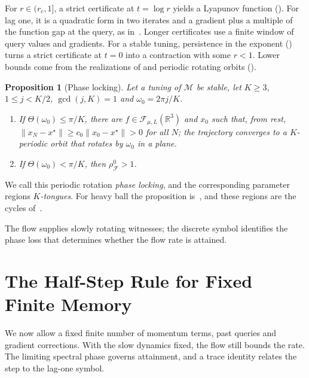 \documentclass[11pt]{article}
\newtheorem{proposition}[theorem]{Proposition}
\theoremstyle{definition}
\theoremstyle{remark}
\newcommand{\R}{\mathbb R}
\newcommand{\cF}{\mathcal F}
\newcommand{\cM}{\mathcal M}
\newcommand{\norm}[1]{\lVert #1\rVert}
\newcommand{\rhoz}{\rho_{\cF}^{0}}
\begin{document}
For \(r\in(r_c,1]\), a strict certificate at \(t=\log r\) yields a Lyapunov function ().
For lag one, it is a quadratic form in two iterates and a gradient plus a
multiple of the function gap at the query, as
in~\cite{VFL18,LRP16,HL17,CHVL18}.  Longer certificates use a finite window
of query values and gradients.  For a stable tuning, persistence in the exponent ()
turns a strict certificate at \(t=0\) into a contraction with some \(r<1\).
Lower bounds come from the realizations of  and periodic rotating orbits ().

\begin{proposition}[Phase locking]\label{prop:cycles}
Let a tuning of \(\cM\) be stable, let \(K\ge3\), \(1\le j<K/2\),
\(\gcd(j,K)=1\) and \(\omega_0=2\pi j/K\).
\begin{enumerate}[label=\textup{(\alph*)}]
\item If \(\Theta(\omega_0)\le\pi/K\), there are \(f\in\cF_{\mu,L}(\R^3)\)
and \(x_0\) such that, from rest,
\(\norm{x_N-x^\star}\ge c_0\norm{x_0-x^\star}>0\) for all \(N\); the
trajectory converges to a \(K\)-periodic orbit that rotates by \(\omega_0\)
in a plane.
\item If \(\Theta(\omega_0)<\pi/K\), then \(\rhoz>1\).
\end{enumerate}
\end{proposition}

We call this periodic rotation \emph{phase locking}, and the corresponding
parameter regions \emph{\(K\)-tongues}.  For heavy ball the proposition
is~\cite[Theorem~3.3(ii)]{TA}, and these regions are the cycles of~\cite{GTD}.

The flow supplies slowly rotating witnesses; the discrete symbol identifies
the phase loss that determines whether the flow rate is attained.

%
\section{The Half-Step Rule for Fixed Finite Memory}
\label{sec:beyond}
%

We now allow a fixed finite number of momentum terms, past queries and gradient
corrections.  With the slow dynamics fixed, the flow still bounds the rate.
The limiting spectral phase governs attainment, and a trace identity relates
the step to the lag-one symbol.
\end{document}
